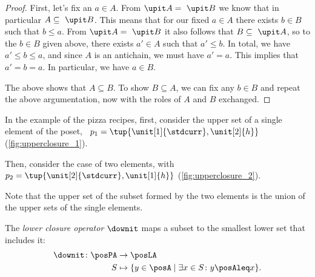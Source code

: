 \begin{proof}
  First, let's fix an $a \in A$. From $\upit  A = \ \upit  B$ we know that in particular $A \subseteq \ \upit  B$. This means that for our fixed $a \in A$ there exists $b \in B$ such that $b \leq a$. From $\upit  A = \ \upit  B$ it also follows that $B \subseteq \ \upit  A$, so to the  $b \in B$ given above, there exists $a' \in A$ such that $a' \leq b$. In total, we have $a' \leq b \leq a$, and since $A$ is an antichain, we must have $a' = a$. This implies that $a' = b = a$. In particular, we have $a \in B$.

  The above shows that $A \subseteq B$. To show $B \subseteq A$, we can fix any $b \in B$ and repeat the above argumentation, now with the roles of $A$ and $B$ exchanged.
\end{proof}

In the example of the pizza recipes, first, consider the upper set of a single element of the poset, \eg ~$p_1=\tup{\unit[1]{\stdcurr},\unit[2]{h}}$  (\cref{fig:upperclosure_1}).
\begin{figure*}[h!]
  \begin{center}
  \end{center}
  \caption{The upper closure of a singleton set of pizza recipes. }
  \label{fig:upperclosure_1}
\end{figure*}
Then, consider the case of two elements, with~$p_2=\tup{\unit[2]{\stdcurr},\unit[1]{h}}$ (\cref{fig:upperclosure_2}).

\begin{figure*}[h!]
  \begin{center}
  \end{center}
  \caption{The upper closure of a set of pizza recipes.  }
  \label{fig:upperclosure_2}
\end{figure*}
Note that the upper set of the subset formed by the two elements is the union of the upper sets of the single elements.

\begin{definition}
  \label{def:lowerclosure}
  The \emph{lower closure operator} $\downit$ maps a subset to the smallest lower set that includes it:
  \begin{equation*}
    \begin{aligned}
      \downit \colon \posPA&\to \posLA\\
      S&\mapsto \{ y\in \posA \mid \exists x\in S \colon y\posAleq x\}.
    \end{aligned}
  \end{equation*}
\end{definition}


